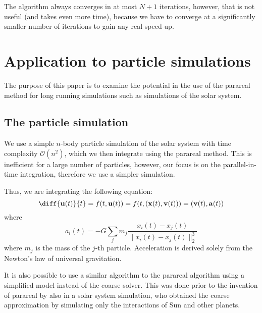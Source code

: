 \documentclass[conference]{IEEEtran}
\begin{document}
The algorithm always converges in at most $N+1$ iterations, however, that is not useful (and takes even more time), because we have to converge at a significantly smaller number of iterations to gain any real speed-up.\cite{speedup}

\section{Application to particle simulations}
The purpose of this paper is to examine the potential in the use of the parareal method for long running simulations such as simulations of the solar system. 

\subsection{The particle simulation}
We use a simple $n$-body particle simulation of the solar system with time complexity $\mathcal{O}(n^2)$, which we then integrate using the parareal method. This is inefficient for a large number of particles, however, our focus is on the parallel-in-time integration, therefore we use a simpler simulation.

Thus, we are integrating the following equation:
$$
\diff{\mathbf{u}(t)}{t} = f(t, \mathbf{u}(t)) = f(t, (\mathbf{x}(t), \mathbf{v}(t))) = (\mathbf{v}(t), \mathbf{a}(t))
$$
where 
$$
a_i(t) = -G \sum_j m_j\frac{x_i(t)-x_j(t)}{\|x_i(t)-x_j(t)\|_2^3}
$$
where $m_j$ is the mass of the $j$-th particle. Acceleration is derived solely from the Newton's law of universal gravitation.

It is also possible to use a similar algorithm to the parareal algorithm using a simplified model instead of the coarse solver. This was done prior to the invention of parareal by \cite{parallelsolar} also in a solar system simulation, who obtained the coarse approximation by simulating only the interactions of Sun and other planets.\cite{parallelsolar}\cite{farfuture}
\end{document}
